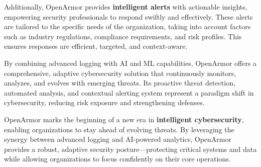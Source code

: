 \newpage
Additionally, OpenArmor provides \textbf{intelligent alerts} with actionable insights, empowering security professionals to respond swiftly and effectively. These alerts are tailored to the specific needs of the organization, taking into account factors such as industry regulations, compliance requirements, and risk profiles. This ensures responses are efficient, targeted, and context-aware.

By combining advanced logging with AI and ML capabilities, OpenArmor offers a comprehensive, adaptive cybersecurity solution that continuously monitors, analyzes, and evolves with emerging threats. Its proactive threat detection, automated analysis, and contextual alerting system represent a paradigm shift in cybersecurity, reducing risk exposure and strengthening defenses.

OpenArmor marks the beginning of a new era in \textbf{intelligent cybersecurity}, enabling organizations to stay ahead of evolving threats. By leveraging the synergy between advanced logging and AI-powered analytics, OpenArmor provides a robust, adaptive security posture—protecting critical systems and data while allowing organizations to focus confidently on their core operations.
